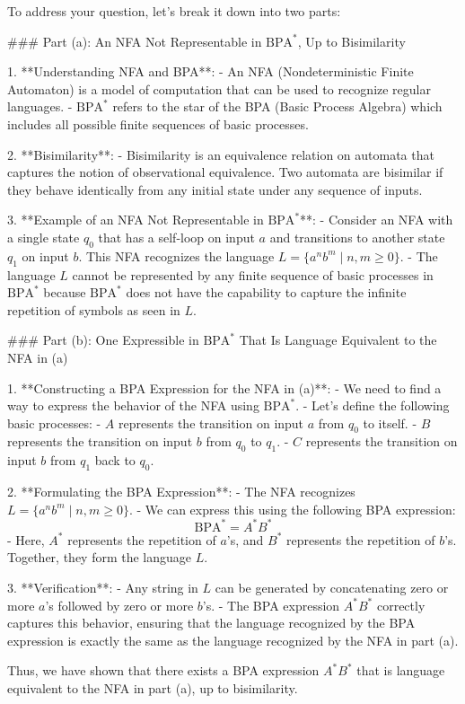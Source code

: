To address your question, let's break it down into two parts: 

### Part (a): An NFA Not Representable in \( \text{BPA}^* \), Up to Bisimilarity

1. **Understanding NFA and BPA**: 
   - An NFA (Nondeterministic Finite Automaton) is a model of computation that can be used to recognize regular languages.
   - \( \text{BPA}^* \) refers to the star of the BPA (Basic Process Algebra) which includes all possible finite sequences of basic processes.

2. **Bisimilarity**:
   - Bisimilarity is an equivalence relation on automata that captures the notion of observational equivalence. Two automata are bisimilar if they behave identically from any initial state under any sequence of inputs.

3. **Example of an NFA Not Representable in \( \text{BPA}^* \)**:
   - Consider an NFA with a single state \( q_0 \) that has a self-loop on input \( a \) and transitions to another state \( q_1 \) on input \( b \). This NFA recognizes the language \( L = \{a^n b^m \mid n, m \geq 0\} \).
   - The language \( L \) cannot be represented by any finite sequence of basic processes in \( \text{BPA}^* \) because \( \text{BPA}^* \) does not have the capability to capture the infinite repetition of symbols as seen in \( L \).

### Part (b): One Expressible in \( \text{BPA}^* \) That Is Language Equivalent to the NFA in (a)

1. **Constructing a BPA Expression for the NFA in (a)**:
   - We need to find a way to express the behavior of the NFA using \( \text{BPA}^* \).
   - Let's define the following basic processes:
     - \( A \) represents the transition on input \( a \) from \( q_0 \) to itself.
     - \( B \) represents the transition on input \( b \) from \( q_0 \) to \( q_1 \).
     - \( C \) represents the transition on input \( b \) from \( q_1 \) back to \( q_0 \).

2. **Formulating the BPA Expression**:
   - The NFA recognizes \( L = \{a^n b^m \mid n, m \geq 0\} \).
   - We can express this using the following BPA expression:
     \[
     \text{BPA}^* = A^* B^*
     \]
   - Here, \( A^* \) represents the repetition of \( a \)'s, and \( B^* \) represents the repetition of \( b \)'s. Together, they form the language \( L \).

3. **Verification**:
   - Any string in \( L \) can be generated by concatenating zero or more \( a \)'s followed by zero or more \( b \)'s.
   - The BPA expression \( A^* B^* \) correctly captures this behavior, ensuring that the language recognized by the BPA expression is exactly the same as the language recognized by the NFA in part (a).

Thus, we have shown that there exists a BPA expression \( A^* B^* \) that is language equivalent to the NFA in part (a), up to bisimilarity.